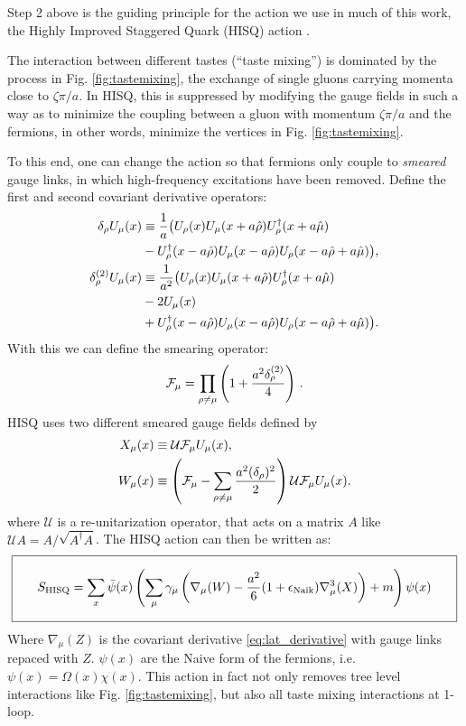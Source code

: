     Step 2 above is the guiding principle for the action we use in much of this work, the Highly Improved Staggered Quark (HISQ) action \cite{Follana:2006rc}.

    The interaction between different tastes (``taste mixing'') is dominated by the process in Fig. \ref{fig:tastemixing}, the exchange of single gluons carrying momenta close to $\zeta \pi/a$. In HISQ, this is suppressed by modifying the gauge fields in such a way as to minimize the coupling between a gluon with momentum ${\zeta\pi/a}$ and the fermions, in other words, minimize the vertices in Fig. \ref{fig:tastemixing}.

    To this end, one can change the action so that fermions only couple to {\textit{smeared}} gauge links, in which high-frequency excitations have been removed. Define the first and second covariant derivative operators:
    \begin{align}
      \nonumber
      \delta_{\rho}U_{\mu}(x) & \equiv {1\over a} \big( U_{\rho} (x) U_{\mu} (x + a\hat{\rho}) U_{\rho}^{\dagger}(x+a\hat{\mu}) \\
      & - U_{\rho}^{\dagger}(x-a\hat{\rho})U_{\mu}(x-a\hat{\rho})U_{\rho}(x-a\hat{\rho}+a\hat{\mu})\big),  \\
      \nonumber
      \delta_{\rho}^{(2)} U_{\mu}(x) & \equiv {1\over a^2} \big( U_{\rho}(x) U_{\mu}(x+a\hat{\rho})U^{\dagger}_{\rho}(x+a\hat{\mu}) \\
      \nonumber
      & - 2U_{\mu}(x) \\
      & + U_{\rho}^{\dagger}(x-a\hat{\rho})U_{\mu}(x-a\hat{\rho})U_{\rho}(x - a\hat{\rho} + a\hat{\mu}) \big).
    \end{align}
    With this we can define the smearing operator:
    \begin{align}
      \mathcal{F}_{\mu} = \prod_{\rho\neq\mu} \left( 1 + {a^2 \delta^{(2)}_{\rho}\over 4} \right)\,.
    \end{align}
    HISQ uses two different smeared gauge fields defined by
    \begin{align}
      X_{\mu}(x) &\equiv \mathcal{U} \mathcal{F}_{\mu} U_{\mu}(x), \\
      W_{\mu}(x) &\equiv \left(\mathcal{F}_{\mu} - \sum_{\rho\neq\mu}{a^2(\delta_{\rho})^2\over 2} \right) \mathcal{U} \mathcal{F}_{\mu} U_{\mu}(x).
      \label{eq:gaugesmearing}
    \end{align}
    where $\mathcal{U}$ is a re-unitarization operator, that acts on a matrix $A$ like $\mathcal{U}A = A/\sqrt{A^{\dagger}A}$. The HISQ action can then be written as:
    \begin{align}
{\setlength\fboxsep{10pt} \boxed{\quad      S_{\text{HISQ}} = \sum_{x} \bar{\psi}(x) \left( \sum_{\mu} \gamma_{\mu} \left( \nabla_{\mu}(W) - {a^2\over 6}(1+\epsilon_{\text{Naik}})\nabla^3_{\mu}(X) \right) + m \right) \psi(x) \quad}}
    \end{align}
    Where $\nabla_{\mu}(Z)$ is the covariant derivative \eqref{eq:lat_derivative} with gauge links repaced with $Z$. $\psi(x)$ are the Naive form of the fermions, i.e. $\psi(x)=\Omega(x)\chi(x)$. This action in fact not only removes tree level interactions like Fig. \ref{fig:tastemixing}, but also all taste mixing interactions at 1-loop.

